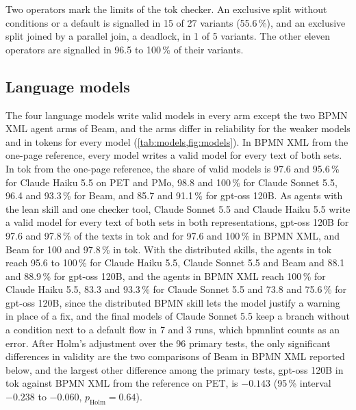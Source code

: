 \documentclass[11pt,a4paper]{article}
\begin{document}
Two operators mark the limits of the tok checker. An exclusive split without conditions or a default is signalled in 15 of 27 variants (55.6\,\%), and an exclusive split joined by a parallel join, a deadlock, in 1 of 5 variants. The other eleven operators are signalled in 96.5 to 100\,\% of their variants.

\subsection{Language models}

The four language models write valid models in every arm except the two BPMN XML agent arms of Beam, and the arms differ in reliability for the weaker models and in tokens for every model (\cref{tab:models,fig:models}). In BPMN XML from the one-page reference, every model writes a valid model for every text of both sets. In tok from the one-page reference, the share of valid models is 97.6 and 95.6\,\% for Claude Haiku 5.5 on PET and PMo, 98.8 and 100\,\% for Claude Sonnet 5.5, 96.4 and 93.3\,\% for Beam, and 85.7 and 91.1\,\% for gpt-oss 120B. As agents with the lean skill and one checker tool, Claude Sonnet 5.5 and Claude Haiku 5.5 write a valid model for every text of both sets in both representations, gpt-oss 120B for 97.6 and 97.8\,\% of the texts in tok and for 97.6 and 100\,\% in BPMN XML, and Beam for 100 and 97.8\,\% in tok. With the distributed skills, the agents in tok reach 95.6 to 100\,\% for Claude Haiku 5.5, Claude Sonnet 5.5 and Beam and 88.1 and 88.9\,\% for gpt-oss 120B, and the agents in BPMN XML reach 100\,\% for Claude Haiku 5.5, 83.3 and 93.3\,\% for Claude Sonnet 5.5 and 73.8 and 75.6\,\% for gpt-oss 120B, since the distributed BPMN skill lets the model justify a warning in place of a fix, and the final models of Claude Sonnet 5.5 keep a branch without a condition next to a default flow in 7 and 3 runs, which bpmnlint counts as an error. After Holm's adjustment over the 96 primary tests, the only significant differences in validity are the two comparisons of Beam in BPMN XML reported below, and the largest other difference among the primary tests, gpt-oss 120B in tok against BPMN XML from the reference on PET, is $-0.143$ (95\,\% interval $-0.238$ to $-0.060$, $p_\text{Holm}=0.64$).
\end{document}
